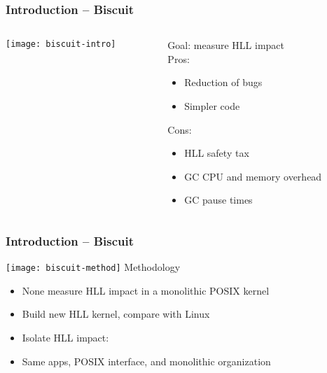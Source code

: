 \begin{frame}[plain]
	\frametitle{Introduction -- Biscuit}
	
	
	
	\begin{columns}
		
		\begin{column}{.5\textwidth}
			
			\texttt{[image: biscuit-intro]}
			
		\end{column}
		
		\begin{column}{.5\textwidth}
			
			\Large
	 	  Goal: measure HLL impact  \\
			
			\normalsize
			Pros:
			\begin{itemize}
				\item Reduction of bugs
				\item Simpler code	
			\end{itemize}
			
			Cons:
			\begin{itemize}
				\item HLL safety tax
				\item GC CPU and memory overhead				
				\item GC pause times	
			\end{itemize}
		\end{column}
		
		
	\end{columns}
	
	
\end{frame}

\begin{frame}[plain]
	\frametitle{Introduction -- Biscuit}
	
	\texttt{[image: biscuit-method]}
	Methodology
	\begin{itemize}
		\item None measure HLL impact in a monolithic POSIX kernel
		\item Build new HLL kernel, compare with Linux
		\item  Isolate HLL impact:
		\item Same apps, POSIX interface, and monolithic organization
		
	\end{itemize}
	
	
\end{frame}


